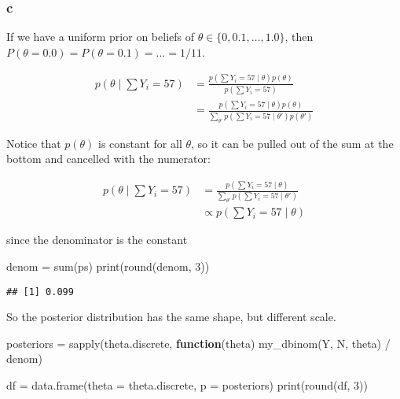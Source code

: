 \documentclass[
]{article}
\newenvironment{Shaded}{\begin{snugshade}}{\end{snugshade}}
\newcommand{\AttributeTok}[1]{\textcolor[rgb]{0.77,0.63,0.00}{#1}}
\newcommand{\ControlFlowTok}[1]{\textcolor[rgb]{0.13,0.29,0.53}{\textbf{#1}}}
\newcommand{\DecValTok}[1]{\textcolor[rgb]{0.00,0.00,0.81}{#1}}
\newcommand{\FunctionTok}[1]{\textcolor[rgb]{0.00,0.00,0.00}{#1}}
\newcommand{\NormalTok}[1]{#1}
\newcommand{\OtherTok}[1]{\textcolor[rgb]{0.56,0.35,0.01}{#1}}
\newcommand{\SpecialCharTok}[1]{\textcolor[rgb]{0.00,0.00,0.00}{#1}}
\begin{document}
\hypertarget{c}{%
\subsubsection{c}\label{c}}

If we have a uniform prior on beliefs of
\(\theta \in \{0, 0.1, \dots, 1.0\}\), then
\(P(\theta = 0.0) = P(\theta = 0.1) = \dots = 1/11\).

\begin{align}
p(\theta \mid \sum Y_i = 57) &= \frac{p(\sum Y_i = 57 \mid \theta)p(\theta)}{p(\sum Y_i = 57)} \\
&= \frac{p(\sum Y_i = 57 \mid \theta)p(\theta)}{\sum_{\theta'} p(\sum Y_i = 57 \mid \theta') p(\theta')} 
\end{align}

Notice that \(p(\theta)\) is constant for all \(\theta\), so it can be
pulled out of the sum at the bottom and cancelled with the numerator:

\begin{align}
p(\theta \mid \sum Y_i = 57)
&= \frac{p(\sum Y_i = 57 \mid \theta)}{\sum_{\theta'} p(\sum Y_i = 57 \mid \theta')} \\
&\propto p(\sum Y_i = 57 \mid \theta)
\end{align}

since the denominator is the constant

\begin{Shaded}
\begin{Highlighting}[]
\NormalTok{denom }\OtherTok{=} \FunctionTok{sum}\NormalTok{(ps)}
\FunctionTok{print}\NormalTok{(}\FunctionTok{round}\NormalTok{(denom, }\DecValTok{3}\NormalTok{))}
\end{Highlighting}
\end{Shaded}

\begin{verbatim}
## [1] 0.099
\end{verbatim}

So the posterior distribution has the same shape, but different scale.

\begin{Shaded}
\begin{Highlighting}[]
\NormalTok{posteriors }\OtherTok{=} \FunctionTok{sapply}\NormalTok{(theta.discrete, }\ControlFlowTok{function}\NormalTok{(theta) }\FunctionTok{my\_dbinom}\NormalTok{(Y, N, theta) }\SpecialCharTok{/}\NormalTok{ denom)}

\NormalTok{df }\OtherTok{=} \FunctionTok{data.frame}\NormalTok{(}\AttributeTok{theta =}\NormalTok{ theta.discrete, }\AttributeTok{p =}\NormalTok{ posteriors)}
\FunctionTok{print}\NormalTok{(}\FunctionTok{round}\NormalTok{(df, }\DecValTok{3}\NormalTok{))}
\end{Highlighting}
\end{Shaded}
\end{document}
